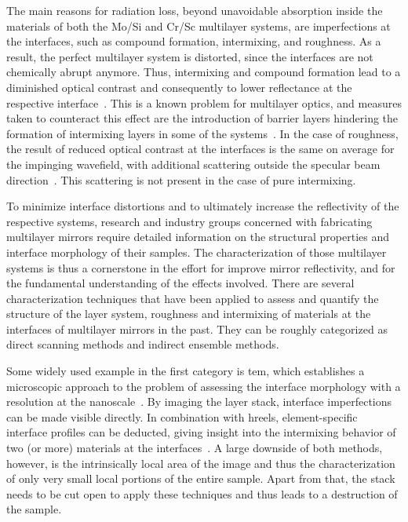 The main reasons for radiation loss, beyond unavoidable absorption inside the
materials of both the Mo/Si and Cr/Sc multilayer systems, are imperfections at
the interfaces, such as compound formation, intermixing, and roughness.
As a result, the perfect multilayer system is distorted, since the interfaces
are not chemically abrupt anymore.
Thus, intermixing and compound formation lead to a diminished optical contrast
and consequently to lower reflectance at the respective
interface~\cite{nakajima_interdiffusion_1988}.
This is a known problem for multilayer optics, and measures taken to counteract
this effect are the introduction of barrier layers hindering the formation of
intermixing layers in some of the
systems~\cite{braun_grenzflachen-optimierte_2003,braun_mo/si_2002}.
In the case of roughness, the result of reduced optical contrast at the
interfaces is the same on average for the impinging wavefield, with additional
scattering outside the specular beam direction~\cite{sinha_X-ray_1994}.
This scattering is not present in the case of pure intermixing.

To minimize interface distortions and to ultimately increase the reflectivity of
the respective systems, research and industry groups concerned with fabricating
multilayer mirrors require detailed information on the structural properties and
interface morphology of their samples.
The characterization of those multilayer systems is thus a cornerstone in the
effort for improve mirror reflectivity, and for the fundamental understanding of
the effects involved.
There are several characterization techniques that have been applied to assess
and quantify the structure of the layer system, roughness and intermixing of
materials at the interfaces of multilayer mirrors in the past.
They can be roughly categorized as direct scanning methods and indirect ensemble
methods.

Some widely used example in the first category is \gls{tem}, which establishes a
microscopic approach to the problem of assessing the interface morphology with a
resolution at the nanoscale~\cite{stearns_thermally_1990,
bajt_investigation_2001}.
By imaging the layer stack, interface imperfections can be made visible
directly.
In combination with \gls{hreels}, element-specific interface profiles can be
deducted, giving insight into the intermixing behavior of two (or more)
materials at the interfaces~\cite{egerton_electron_2011,
prasciolu_thermal_2014}.
A large downside of both methods, however, is the intrinsically local area of
the image and thus the characterization of only very small local portions of the
entire sample.
Apart from that, the stack needs to be cut open to apply these techniques and
thus leads to a destruction of the sample.

